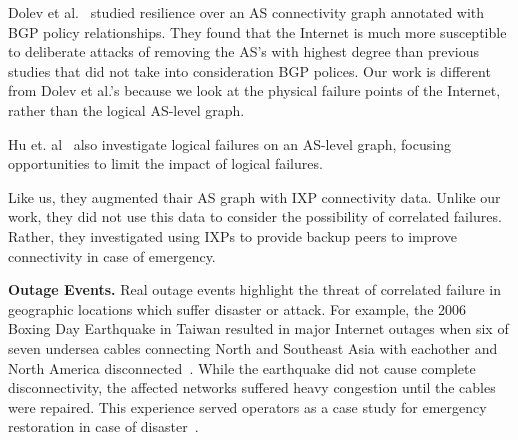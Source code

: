     Dolev et al.~\cite{resilience-under-BGP} studied resilience over an AS
    connectivity graph annotated with BGP policy relationships. They found that
    the Internet is much more susceptible to deliberate attacks of removing the
    AS's with highest degree than previous studies that did not take into
    consideration BGP polices. Our work is different from Dolev et al.'s because
    we look at the physical failure points of the Internet, rather than the
    logical AS-level graph.  
    
    Hu et. al~\cite{ixp-routingdiversity} also investigate logical failures on
    an AS-level graph, focusing opportunities to limit the impact of logical
    failures.

    Like us, they augmented thair AS graph with IXP connectivity data.  Unlike
    our work, they did not use this data to consider the possibility of
    correlated failures.  Rather, they investigated using IXPs to provide
    backup peers to improve connectivity in case of emergency.

{\bf Outage Events.}  Real outage events highlight the threat of correlated
    failure in geographic locations which suffer disaster or attack.  For
    example, the 2006 Boxing Day Earthquake in Taiwan resulted in major Internet
    outages when six of seven undersea cables connecting North and Southeast
    Asia with eachother and North America disconnected~\cite{asia-comm-quake}.
    While the earthquake did not cause complete disconnectivity, the affected
    networks suffered heavy congestion until the cables were repaired.  This
    experience served operators as a case study for emergency restoration in
    case of disaster~\cite{taiwan}.  
       


